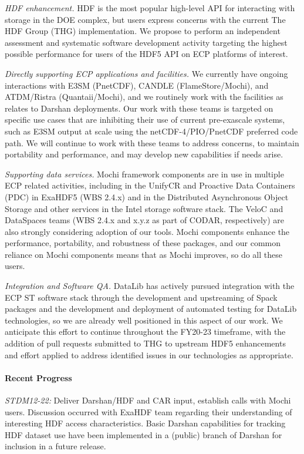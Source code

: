 \emph{HDF enhancement.} HDF is the most popular high-level API for
interacting with storage in the DOE complex, but users express concerns
with the current The HDF Group (THG) implementation. We propose to perform
an independent assessment and systematic software development activity
targeting the highest possible performance for users of the HDF5 API on
ECP platforms of interest.

\emph{Directly supporting ECP applications and facilities.} We currently
have ongoing interactions with E3SM (PnetCDF), CANDLE (FlameStore/Mochi),
and ATDM/Ristra (Quantaii/Mochi), and we routinely work with the
facilities as relates to Darshan deployments. Our work with these
teams is targeted on specific use cases that are inhibiting their use
of current pre-exascale systems, such as E3SM output at scale using the
netCDF-4/PIO/PnetCDF preferred code path. We will continue to work with
these teams to address concerns, to maintain portability and performance,
and may develop new capabilities if needs arise. 

\emph{Supporting data services.} Mochi framework components are in use in
multiple ECP related activities, including in the UnifyCR and Proactive
Data Containers (PDC) in ExaHDF5 (WBS 2.4.x) and in the Distributed
Asynchronous Object Storage and other services in the Intel storage
software stack. The VeloC and DataSpaces teams (WBS 2.4.x and x.y.z as
part of CODAR, respectively) are also strongly considering adoption
of our tools. Mochi components enhance the performance, portability,
and robustness of these packages, and our common reliance on Mochi
components means that as Mochi improves, so do all these users.

\emph{Integration and Software QA.} DataLib has actively pursued
integration with the ECP ST software stack through the development
and upstreaming of Spack packages and the development and deployment
of automated testing for DataLib technologies, so we are already well
positioned in this aspect of our work. We anticipate this effort to
continue throughout the FY20-23 timeframe, with the addition of pull
requests submitted to THG to upstream HDF5 enhancements and effort applied
to address identified issues in our technologies as appropriate.

\paragraph{Recent Progress}

\emph{STDM12-22:} Deliver Darshan/HDF and CAR input, establish calls with Mochi
users. Discussion occurred with ExaHDF team regarding their understanding of
interesting HDF access characteristics. Basic Darshan capabilities for tracking
HDF dataset use have been implemented in a (public) branch of Darshan for
inclusion in a future release.

